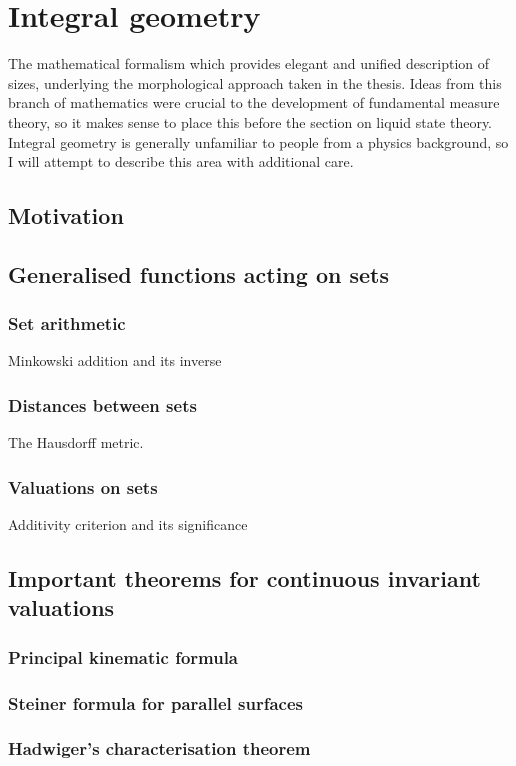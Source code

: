 \section{Integral geometry}
The mathematical formalism which provides elegant and unified description of sizes, underlying the morphological approach taken in the thesis.
Ideas from this branch of mathematics were crucial to the development of fundamental measure theory, so it makes sense to place this before the section
on liquid state theory.
Integral geometry is generally unfamiliar to people from a physics background, so I will attempt to describe this area with additional care.

\subsection{Motivation}

\subsection{Generalised functions acting on sets}
\subsubsection{Set arithmetic}
Minkowski addition and its inverse
\subsubsection{Distances between sets}
The Hausdorff metric.
\subsubsection{Valuations on sets}
Additivity criterion and its significance

\subsection{Important theorems for continuous invariant valuations}
\subsubsection{Principal kinematic formula}
\subsubsection{Steiner formula for parallel surfaces}
\subsubsection{Hadwiger’s characterisation theorem}

